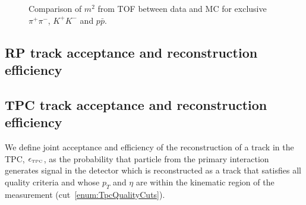 \begin{figure}[ht!]
{  \begin{subfigure}[b]{\linewidth}{
                }
  \end{subfigure}
}%
\caption{Comparison of $m^{2}$ from TOF between data and MC for exclusive $\pi^{+}\pi^{-}$, $K^{+}K^{-}$ and $p\bar{p}$.}
\end{figure}









\subsection{RP track acceptance and reconstruction efficiency}\label{sec:rpAccAndEff}
\subsection{TPC track acceptance and reconstruction efficiency}\label{sec:tpcAccAndEff}

We define joint acceptance and efficiency of the reconstruction of a track in the TPC, $\epsilon_{\textrm{\tiny TPC}}$, as the probability that particle from the primary interaction generates signal in the detector which is reconstructed as a track that satisfies all quality criteria and whose $p_{T}$ and $\eta$ are within the kinematic region of the measurement (cut~\ref{enum:TpcQualityCuts}).

